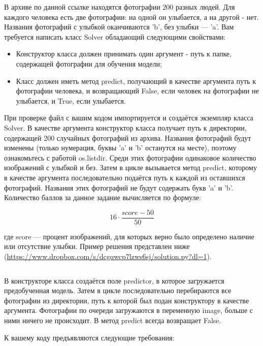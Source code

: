 
В архиве по данной ссылке находятся фотографии 200 разных людей. 
Для каждого человека есть две фотографии: на одной он улыбается, а на другой - нет. Названия фотографий 
с улыбкой оканчиваются 'b', без улыбки — 'a'. Вам требуется написать класс Solver обладающий следующими свойствами:

\begin{itemize}
    \item Конструктор класса должен принимать один аргумент - путь к папке, содержащей фотографии для обучения модели;
    \item Класс должен иметь метод predict, получающий в качестве аргумента путь к фотографии человека, и возвращающий False, если человек на фотографии не улыбается, и True, если улыбается.
\end{itemize}

При проверке файл с вашим кодом импортируется и создаётся экземпляр класса Solver. В качестве аргумента 
конструктор класса получает путь к директории, содержащей 200 случайных фотографий из архива. Названия 
фотографий будут изменены (только нумерация, буквы 'a' и 'b' останутся на месте), поэтому ознакомьтесь с 
работой os.listdir. Среди этих фотографии одинаковое количество изображений с улыбкой и без. Затем в цикле 
вызывается метод predict, которому в качестве аргумента последовательно подаётся путь к каждой из оставшихся 
фотографий. Названия этих фотографий не будут содержать букв  'a' и 'b'. Количество баллов за данное 
задание вычисляется по формуле:

$$16 \cdot \frac{score - 50}{50}$$

где score — процент изображений, для которых верно было определено наличие или отсутствие улыбки.
Пример решения представлен ниже (\url{https://www.dropbox.com/s/dcgqwcp7lzws6sj/solution.py?dl=1}).

\inputminted[fontsize=\footnotesize, linenos]{python}{2nd_tour/neuro/task_09/part_01.py}

В конструкторе класса создаётся поле predictor, в которое загружается предобученная модель. Затем в цикле последовательно перебираются все фотографии из директории, путь к которой был подан конструктору в качестве аргумента. Фотографии по очереди загружаются в переменную image, больше с ними ничего не происходит.
В метод predict всегда возвращает False.

К вашему коду предъявляются следующие требования:

